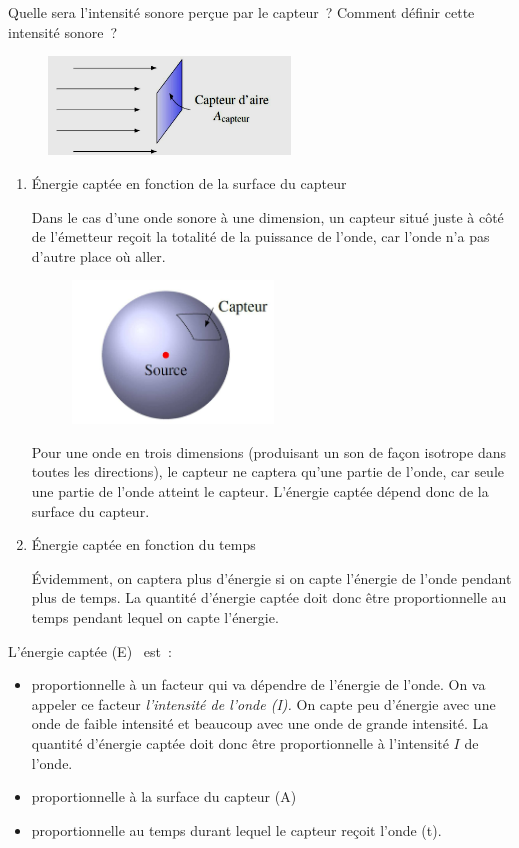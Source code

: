 Quelle sera l'intensité sonore perçue par le capteur~? Comment définir
cette intensité sonore~?

\begin{figure}
\centering
\includegraphics[width=6.442cm,height=2.623cm]{Pictures/10000001000001C2000000B7D5766B8618542229.png}
\caption{}
\end{figure}

\begin{enumerate}
\item Énergie captée en fonction de la surface du capteur

Dans le cas d'une onde sonore à une dimension, un capteur situé juste à
côté de l'émetteur reçoit la totalité de la puissance de l'onde, car
l'onde n'a pas d'autre place où aller.

\begin{figure}
\centering
\includegraphics[width=5.355cm,height=3.808cm]{Pictures/10000001000001A50000012CD4D736604ADF8EAC.png}
\caption{}
\end{figure}

Pour une onde en trois dimensions (produisant un son de façon isotrope
dans toutes les directions), le capteur ne captera qu'une partie de
l'onde, car seule une partie de l'onde atteint le capteur. L'énergie
captée dépend donc de la surface du capteur.

\item Énergie captée en fonction du temps

Évidemment, on captera plus d'énergie si on capte l'énergie de l'onde
pendant plus de temps. La quantité d'énergie captée doit donc être
proportionnelle au temps pendant lequel on capte l'énergie.
\end{enumerate}

L'énergie captée (E)~ est~: 
\begin{itemize}
\item proportionnelle à un facteur qui va dépendre de l'énergie de l'onde.
On va appeler ce facteur \emph{l'intensité de l'onde (I).} On capte peu
d'énergie avec une onde de faible intensité et beaucoup avec une onde de
grande intensité. La quantité d'énergie captée doit donc être
proportionnelle à l'intensité $I$ de l'onde.
 \item proportionnelle à la surface du capteur (A)
 \item proportionnelle au temps durant lequel le capteur reçoit l'onde (t).
\end{itemize}

